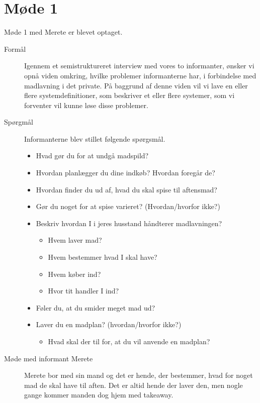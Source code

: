 \section{Møde 1}

Møde 1 med Merete er blevet optaget\cite{moede1merete}.

\begin{description}
\item[Formål] Igennem et semistruktureret interview med vores to informanter, ønsker vi opnå viden omkring, hvilke problemer informanterne har, i forbindelse med madlavning i det private. På baggrund af denne viden vil vi lave en eller flere systemdefinitioner, som beskriver et eller flere systemer, som vi forventer vil kunne løse disse problemer. 

\item[Spørgmål] Informanterne blev stillet følgende spørgsmål.

\begin{itemize}[noitemsep]
\item Hvad gør du for at undgå madspild?
\item Hvordan planlægger du dine indkøb? Hvordan foregår de?
\item Hvordan finder du ud af, hvad du skal spise til aftensmad?
\item Gør du noget for at spise varieret? (Hvordan/hvorfor ikke?)
\item Beskriv hvordan I i jeres husstand håndterer madlavningen?
\begin{itemize}[noitemsep]
\item Hvem laver mad?
\item Hvem bestemmer hvad I skal have?
\item Hvem køber ind?
\item Hvor tit handler I ind?
\end{itemize}
\item Føler du, at du smider meget mad ud?
\item Laver du en madplan? (hvordan/hvorfor ikke?)
\begin{itemize}[noitemsep]
\item Hvad skal der til for, at du vil anvende en madplan?
\end{itemize}
\end{itemize}

\item[Møde med informant Merete]
Merete bor med sin mand og det er hende, der bestemmer, hvad for noget mad de skal have til aften. Det er altid hende der laver den, men nogle gange kommer manden dog hjem med takeaway.


\end{description}
